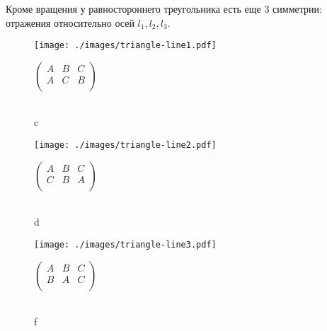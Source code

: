 \documentclass[12pt]{article}
\begin{document}
Кроме вращения у равностороннего треугольника есть еще 3 симметрии: отражения относительно осей $l_1, l_2, l_3$.

\begin{figure}[H]
  \centering
  \begin{minipage}{.5\textwidth}
    \centering
    \texttt{[image: ./images/triangle-line1.pdf]}
  \end{minipage}
  \begin{minipage}{.2\textwidth}
    \centering
    $
    \left(\begin{array}{ccc}
      A & B & C \\
      A & C & B\\
    \end{array}\right)
    $

    \hrulefill\\
    c
  \end{minipage}
\end{figure}
\begin{figure}[H]
  \centering
  \begin{minipage}{.5\textwidth}
    \centering
    \texttt{[image: ./images/triangle-line2.pdf]}
  \end{minipage}
  \begin{minipage}{.2\textwidth}
    \centering
    $
    \left(\begin{array}{ccc}
      A & B & C\\
      C & B & A\\
    \end{array}\right)
    $

    \hrulefill\\
    d
  \end{minipage}
\end{figure}

\begin{figure}[H]
  \centering
  \begin{minipage}{.5\textwidth}
    \centering
    \texttt{[image: ./images/triangle-line3.pdf]}
  \end{minipage}
  \begin{minipage}{.2\textwidth}
    \centering
    $
    \left(\begin{array}{ccc}
      A & B & C\\
      B & A & C\\
    \end{array}\right)
    $

    \hrulefill\\
    f
  \end{minipage}
\end{figure}
\end{document}
